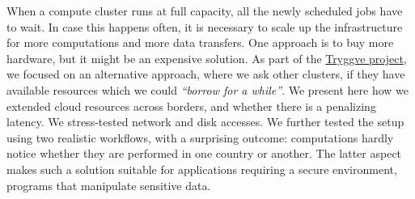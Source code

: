 When a compute cluster runs at full capacity, all the newly scheduled
jobs have to wait. In case this happens often, it is necessary to
scale up the infrastructure for more computations and more data
transfers.
%
One approach is to buy more hardware, but it might be an expensive
solution.
%
As part of the \href{https://wiki.neic.no/wiki/Tryggve}{Tryggve
project}, we focused on an alternative approach, where we ask other
clusters, if they have available resources which we could
\emph{``borrow for a while''}.
%
We present here how we extended cloud resources across borders, and
whether there is a penalizing latency.
%
We stress-tested network and disk accesses. We further tested the
setup using two realistic workflows, with a surprising outcome:
computations hardly notice whether they are performed in one country
or another.
%
The latter aspect makes such a solution suitable for applications
requiring a secure environment, \eg programs that manipulate
sensitive data.
